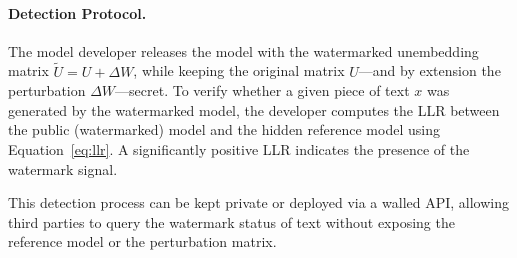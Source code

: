 \paragraph{Detection Protocol.}
The model developer releases the model with the watermarked unembedding matrix \( \tilde{U} = U + \Delta W \), while keeping the original matrix \( U \)—and by extension the perturbation \( \Delta W \)—secret. To verify whether a given piece of text \( x \) was generated by the watermarked model, the developer computes the LLR between the public (watermarked) model and the hidden reference model using Equation~\ref{eq:llr}. A significantly positive LLR indicates the presence of the watermark signal.

This detection process can be kept private or deployed via a walled API, allowing third parties to query the watermark status of text without exposing the reference model or the perturbation matrix.


